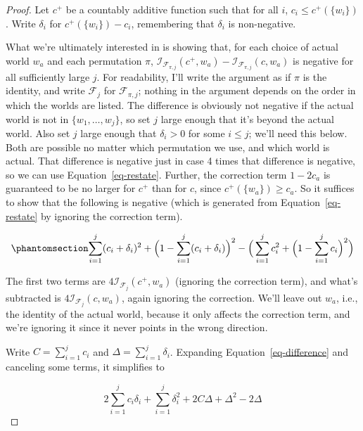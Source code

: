 \documentclass[
  11pt,
  letterpaper,
  DIV=11,
  numbers=noendperiod,
  twoside]{scrartcl}
\theoremstyle{definition}
\theoremstyle{plain}
\theoremstyle{plain}
\theoremstyle{remark}
\begin{document}
\begin{proof}
Let \(c^+\) be a countably additive function such that for all \(i\),
\(c_i \leqslant c^+(\{w_i\})\). Write \(\delta_i\) for
\(c^+(\{w_i\}) - c_i\), remembering that \(\delta_i\) is non-negative.

What we're ultimately interested in is showing that, for each choice of
actual world \(w_a\) and each permutation \(\pi\),
\(\mathcal{I}_{\mathcal{F}_{\pi,j}}(c^+, w_a) - \mathcal{I}_{\mathcal{F}_{\pi,j}}(c, w_a)\)
is negative for all sufficiently large \(j\). For readability, I'll
write the argument as if \(\pi\) is the identity, and write
\(\mathcal{F}_j\) for \(\mathcal{F}_{\pi,j}\); nothing in the argument
depends on the order in which the worlds are listed. The difference is
obviously not negative if the actual world is not in
\(\{w_1, \dots, w_j\}\), so set \(j\) large enough that it's beyond the
actual world. Also set \(j\) large enough that \(\delta_i > 0\) for some
\(i \leqslant j\); we'll need this below. Both are possible no matter
which permutation we use, and which world is actual. That difference is
negative just in case 4 times that difference is negative, so we can use
Equation~\ref{eq-restate}. Further, the correction term \(1 - 2c_a\) is
guaranteed to be no larger for \(c^+\) than for \(c\), since
\(c^+(\{w_a\}) \geqslant c_a\). So it suffices to show that the
following is negative (which is generated from Equation~\ref{eq-restate}
by ignoring the correction term).

\begin{equation}\protect\phantomsection\label{eq-difference}{
\sum_{i=1}^{j}(c_i + \delta_i)^2 + \Big(1- \sum_{i=1}^{j}(c_i + \delta_i)\Big)^2 - \Big(\sum_{i=1}^{j}c_i^2 + \Big(1- \sum_{i=1}^{j}c_i\Big)^2\Big)
}\end{equation}

The first two terms are \(4\mathcal{I}_{\mathcal{F}_j}(c^+, w_a)\)
(ignoring the correction term), and what's subtracted is
\(4\mathcal{I}_{\mathcal{F}_j}(c, w_a)\), again ignoring the correction.
We'll leave out \(w_a\), i.e., the identity of the actual world, because
it only affects the correction term, and we're ignoring it since it
never points in the wrong direction.

Write \(C = \sum_{i=1}^j c_i\) and \(\Delta = \sum_{i=1}^j \delta_i\).
Expanding Equation~\ref{eq-difference} and canceling some terms, it
simplifies to

\[
2\sum_{i=1}^j c_i \delta_i + \sum_{i=1}^j \delta_i^2 + 2C\Delta + \Delta^2 - 2\Delta
\]


\end{proof}
\end{document}
